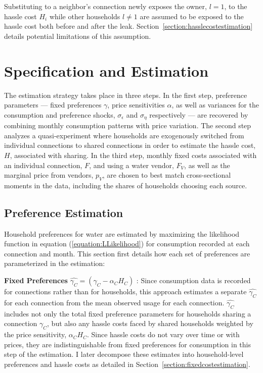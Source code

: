 \documentclass[12pt]{article}
\begin{document}
Substituting to a neighbor's connection newly exposes the owner, $l=1$, to the hassle cost $H_i$ while other households $l \neq 1$ are assumed to be exposed to the hassle cost both before and after the leak.  Section~\ref{section:hasslecostestimation} details potential limitations of this assumption.










\section{Specification and Estimation}\label{section:specificationandestimation}

The estimation strategy takes place in three steps.  In the first step, preference parameters --- fixed preferences $\gamma$, price sensitivities $\alpha$, as well as variances for the consumption and preference shocks, $\sigma_{\epsilon}$ and $\sigma_{\eta}$ respectively --- are recovered by combining monthly consumption patterns with price variation.  The second step analyzes a quasi-experiment where households are exogenously switched from individual connections to shared connections in order to estimate the hassle cost, $H$, associated with sharing.  In the third step, monthly fixed costs associated with an individual connection, $F$, and using a water vendor, $F_{V}$, as well as the marginal price from vendors, $p_V$, are chosen to best match cross-sectional moments in the data, including the shares of households choosing each source.

\subsection{Preference Estimation}\label{section:preferenceestimation}

Household preferences for water are estimated by maximizing the likelihood function in equation (\ref{equation:LLikelihood}) for consumption recorded at each connection and month.  This section first details how each set of preferences are parameterized in the estimation:

\textbf{Fixed Preferences} $\hat{\gamma_C} = (\gamma_C - \alpha_C H_C)$  :  Since consumption data is recorded for connections rather than for households, this approach estimates a separate $\hat{\gamma_C}$ for each connection from the mean observed usage for each connection.  $\hat{\gamma_C}$ includes not only the total fixed preference parameters for households sharing a connection $\gamma_C$, but also any hassle costs faced by shared households weighted by the price sensitivity, $\alpha_C H_C$.  Since hassle costs do not vary over time or with prices, they are indistinguishable from fixed preferences for consumption in this step of the estimation.  I later decompose these estimates into household-level preferences and hassle costs as detailed in Section~\ref{section:fixedcostestimation}.
\end{document}
